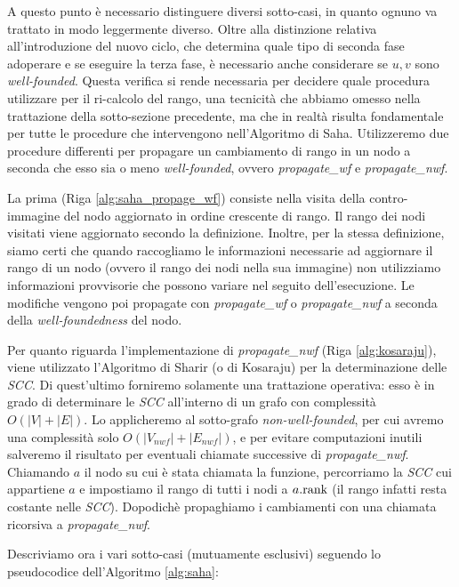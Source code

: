 A questo punto è necessario distinguere diversi sotto-casi, in quanto ognuno va trattato in modo leggermente diverso. Oltre alla distinzione relativa all'introduzione del nuovo ciclo, che determina quale tipo di seconda fase adoperare e se eseguire la terza fase, è necessario anche considerare se $u,v$ sono \emph{well-founded}. Questa verifica si rende necessaria per decidere quale procedura utilizzare per il ri-calcolo del rango, una tecnicità che abbiamo omesso nella trattazione della sotto-sezione precedente, ma che in realtà risulta fondamentale per tutte le procedure che intervengono nell'Algoritmo di Saha. Utilizzeremo due procedure differenti per propagare un cambiamento di rango in un nodo a seconda che esso sia o meno \emph{well-founded}, ovvero \emph{propagate\_wf} e \emph{propagate\_nwf}.

La prima (Riga \ref{alg:saha_propage_wf}) consiste nella visita della contro-immagine del nodo aggiornato in ordine crescente di rango. Il rango dei nodi visitati viene aggiornato secondo la definizione. Inoltre, per la stessa definizione, siamo certi che quando raccogliamo le informazioni necessarie ad aggiornare il rango di un nodo (ovvero il rango dei nodi nella sua immagine) non utilizziamo informazioni provvisorie che possono variare nel seguito dell'esecuzione. Le modifiche vengono poi propagate con \emph{propagate\_wf} o \emph{propagate\_nwf} a seconda della \emph{well-foundedness} del nodo.

Per quanto riguarda l'implementazione di \emph{propagate\_nwf} (Riga \ref{alg:kosaraju}), viene utilizzato l'Algoritmo di Sharir (o di Kosaraju) \cite{sharir} per la determinazione delle \emph{SCC}. Di quest'ultimo forniremo solamente una trattazione operativa: esso è in grado di determinare le \emph{SCC} all'interno di un grafo con complessità $O(|V| + |E|)$. Lo applicheremo al sotto-grafo \emph{non-well-founded}, per cui avremo una complessità solo $O(|V_{nwf}| + |E_{nwf}|)$, e per evitare computazioni inutili salveremo il risultato per eventuali chiamate successive di \emph{propagate\_nwf}. Chiamando $a$ il nodo su cui è stata chiamata la funzione, percorriamo la \emph{SCC} cui appartiene $a$ e impostiamo il rango di tutti i nodi a $a.\textup{rank}$ (il rango infatti resta costante nelle \emph{SCC}). Dopodichè propaghiamo i cambiamenti con una chiamata ricorsiva a \emph{propagate\_nwf}.

Descriviamo ora i vari sotto-casi (mutuamente esclusivi) seguendo lo pseudocodice dell'Algoritmo \ref{alg:saha}:

